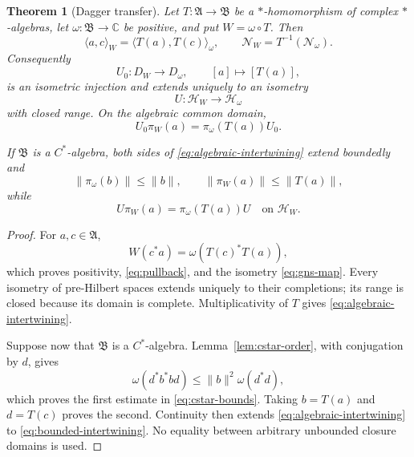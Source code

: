 \documentclass[11pt]{article}
\newtheorem{theorem}{Theorem}[section]
\theoremstyle{definition}
\theoremstyle{remark}
\numberwithin{equation}{section}
\newcommand{\cN}{\mathcal N}
\newcommand{\C}{\mathbb C}
\begin{document}
\begin{theorem}[Dagger transfer]
\label{thm:dagger}
Let $T:\mathfrak A\to\mathfrak B$ be a $*$-homomorphism of complex
$*$-algebras, let $\omega:\mathfrak B\to\C$ be positive, and put
$W=\omega\circ T$.  Then
\begin{equation}
 \langle a,c\rangle_W
 =\langle T(a),T(c)\rangle_\omega,
 \qquad
 \cN_W=T^{-1}(\cN_\omega).
 \label{eq:pullback}
\end{equation}
Consequently
\begin{equation}
 U_0:D_W\longrightarrow D_\omega,
 \qquad [a]\longmapsto[T(a)],
 \label{eq:gns-map}
\end{equation}
is an isometric injection and extends uniquely to an isometry
\begin{equation}
 U:\mathcal H_W\longrightarrow\mathcal H_\omega
 \label{eq:completion-map}
\end{equation}
with closed range.  On the algebraic common domain,
\begin{equation}
 U_0\pi_W(a)=\pi_\omega(T(a))U_0.
 \label{eq:algebraic-intertwining}
\end{equation}

If $\mathfrak B$ is a $C^*$-algebra, both sides of
\eqref{eq:algebraic-intertwining} extend boundedly and
\begin{equation}
 \|\pi_\omega(b)\|\leq\|b\|,
 \qquad
 \|\pi_W(a)\|\leq\|T(a)\|,
 \label{eq:cstar-bounds}
\end{equation}
while
\begin{equation}
 U\pi_W(a)=\pi_\omega(T(a))U
 \quad\text{on }\mathcal H_W.
 \label{eq:bounded-intertwining}
\end{equation}
\end{theorem}

\begin{proof}
For $a,c\in\mathfrak A$,
\[
 W(c^*a)=\omega(T(c)^*T(a)),
\]
which proves positivity, \eqref{eq:pullback}, and the isometry
\eqref{eq:gns-map}.  Every isometry of pre-Hilbert spaces extends
uniquely to their completions; its range is closed because its domain is
complete.  Multiplicativity of $T$ gives
\eqref{eq:algebraic-intertwining}.

Suppose now that $\mathfrak B$ is a $C^*$-algebra.  Lemma~\ref{lem:cstar-order}, with conjugation by $d$, gives
\[
 \omega(d^*b^*bd)\leq\|b\|^2\omega(d^*d),
\]
which proves the first estimate in \eqref{eq:cstar-bounds}.  Taking
$b=T(a)$ and $d=T(c)$ proves the second.  Continuity then extends
\eqref{eq:algebraic-intertwining} to
\eqref{eq:bounded-intertwining}.  No equality between arbitrary
unbounded closure domains is used.
\end{proof}
\end{document}
